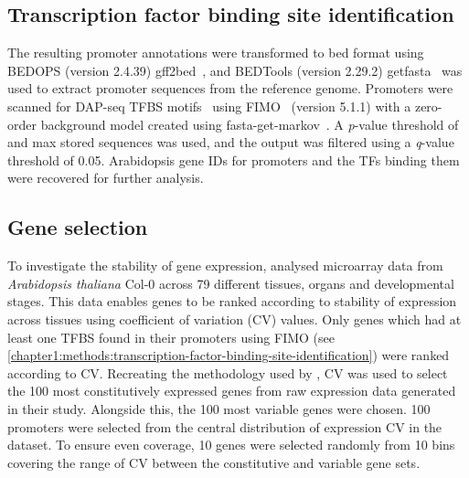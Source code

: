 \documentclass[../main.tex]{subfiles}
\begin{document}
\subsection{Transcription factor binding site identification}
\label{chapter1:methods:transcription-factor-binding-site-identification}
The resulting promoter annotations were transformed to bed format using BEDOPS (version 2.4.39) gff2bed~\autocite{nephBEDOPSHighperformanceGenomic2012}, and BEDTools (version 2.29.2) getfasta~\autocite{quinlanBEDToolsFlexibleSuite2010} was used to extract promoter sequences from the reference genome.
Promoters were scanned for DAP\hyp{}seq TFBS motifs~\autocite{omalleyCistromeEpicistromeFeatures2016} using FIMO~\autocite{grantFIMOScanningOccurrences2011} (version 5.1.1) with a zero\hyp{}order background model created using fasta\hyp{}get\hyp{}markov~\autocite{baileyMEMESuiteTools2009}.
A \textit{p}\hyp{}value threshold of  and max stored sequences  was used, and the output was filtered using a \textit{q}\hyp{}value threshold of 0.05.
Arabidopsis gene IDs for promoters and the TFs binding them were recovered for further analysis.

\subsection{Gene selection}\label{chapter1:methods:gene-selection}

To investigate the stability of gene expression, \textcite*{czechowskiGenomeWideIdentificationTesting2005} analysed microarray data from \textit{Arabidopsis thaliana} Col-0 across 79 different tissues, organs and developmental stages.
This data enables genes to be ranked according to stability of expression across tissues using coefficient of variation (CV) values.
Only genes which had at least one TFBS found in their promoters using FIMO (see \autoref{chapter1:methods:transcription-factor-binding-site-identification}) were ranked according to CV.
Recreating the methodology used by \textcite*{czechowskiGenomeWideIdentificationTesting2005}, CV was used to select the 100 most constitutively expressed genes from raw expression data generated in their study.
Alongside this, the 100 most variable genes were chosen.
100 promoters were selected from the central distribution of expression CV in the \textcite*{czechowskiGenomeWideIdentificationTesting2005} dataset.
To ensure even coverage, 10 genes were selected randomly from 10 bins covering the range of CV between the constitutive and variable gene sets.
\end{document}

